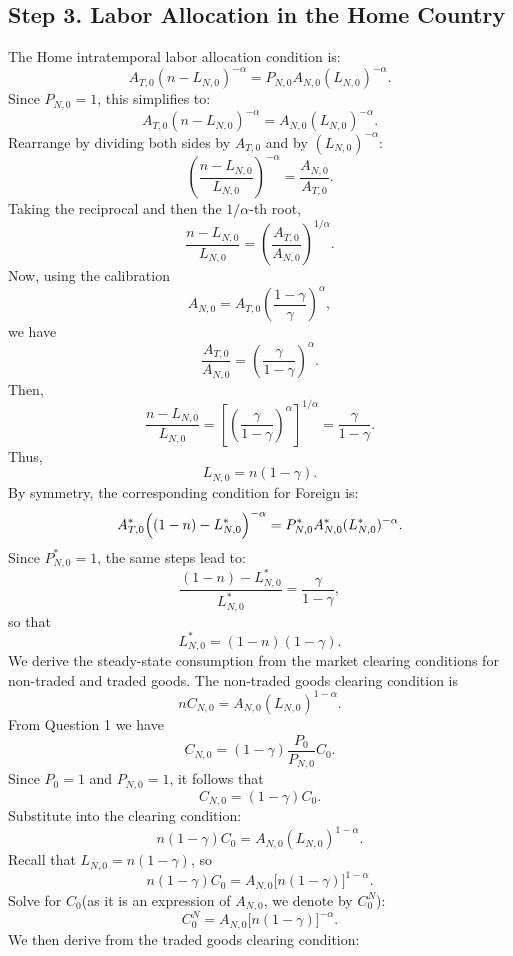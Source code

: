 \documentclass[a4paper,12pt]{article} %
\theoremstyle{nonitalic}
\begin{document}
\subsection*{Step 3. Labor Allocation in the Home Country}
The Home intratemporal labor allocation condition is:
\[
A_{T,0} (n-L_{N,0})^{-\alpha} = P_{N,0} A_{N,0} (L_{N,0})^{-\alpha}.
\]
Since $P_{N,0}=1$, this simplifies to:
\[
A_{T,0} (n-L_{N,0})^{-\alpha} = A_{N,0} (L_{N,0})^{-\alpha}.
\]
Rearrange by dividing both sides by $A_{T,0}$ and by $(L_{N,0})^{-\alpha}$:
\[
\left(\frac{n-L_{N,0}}{L_{N,0}}\right)^{-\alpha} = \frac{A_{N,0}}{A_{T,0}}.
\]
Taking the reciprocal and then the $1/\alpha$-th root,
\[
\frac{n-L_{N,0}}{L_{N,0}} = \left(\frac{A_{T,0}}{A_{N,0}}\right)^{1/\alpha}.
\]
Now, using the calibration 
\[
A_{N,0} = A_{T,0}\left(\frac{1-\gamma}{\gamma}\right)^{\alpha},
\]
we have
\[
\frac{A_{T,0}}{A_{N,0}} = \left(\frac{\gamma}{1-\gamma}\right)^{\alpha}.
\]
Then,
\[
\frac{n-L_{N,0}}{L_{N,0}} = \left[\left(\frac{\gamma}{1-\gamma}\right)^{\alpha}\right]^{1/\alpha} = \frac{\gamma}{1-\gamma}.
\]
Thus,
\[
L_{N,0} = n(1-\gamma). \tag{6c}
\]
By symmetry, the corresponding condition for Foreign is:
\[
A^*_{T,0}\Bigl((1-n)-L^*_{N,0}\Bigr)^{-\alpha} = P^*_{N,0} A^*_{N,0} (L^*_{N,0})^{-\alpha}.
\]
Since $P^*_{N,0}=1$, the same steps lead to:
\[
\frac{(1-n)-L^*_{N,0}}{L^*_{N,0}} = \frac{\gamma}{1-\gamma},
\]
so that
\[
L^*_{N,0} = (1-n)(1-\gamma). \tag{6d}
\]
We derive the steady-state consumption from the market clearing conditions for non-traded and traded goods.
The non-traded goods clearing condition is
\[
n C_{N,0} = A_{N,0} (L_{N,0})^{1-\alpha}.
\]
From Question 1 we have
\[
C_{N,0} = (1-\gamma) \frac{P_0}{P_{N,0}} C_0.
\]
Since $P_0=1$ and $P_{N,0}=1$, it follows that
\[
C_{N,0} = (1-\gamma) C_0.
\]
Substitute into the clearing condition:
\[
n (1-\gamma) C_0 = A_{N,0} (L_{N,0})^{1-\alpha}.
\]
Recall that $L_{N,0} = n(1-\gamma)$, so
\[
n (1-\gamma) C_0 = A_{N,0} \bigl[n(1-\gamma)\bigr]^{1-\alpha}.
\]
Solve for $C_0$(as it is an expression of $A_{N,0}$, we denote by $C_0^N$):
\[
C_0^N = A_{N,0}  \bigl[n(1-\gamma)\bigr]^{-\alpha}.
\]
We then derive from the traded goods clearing condition:
\end{document}
